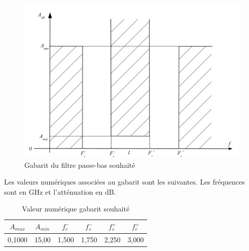 \documentclass[french]{article}
\begin{document}
\begin{figure}[H]
	\centering
	\includegraphics[width=0.5\linewidth]{ressources/gabarit_passe_bande}
	\caption{Gabarit du filtre passe-bas souhaité}
	\label{fig:gab}
\end{figure}
Les valeurs numériques associées au gabarit sont les suivantes. Les fréquences sont en GHz et l'atténuation en dB. 
	\begin{table}[H]
		\centering
\begin{tabular}{|c|c|c|c|c|c|}
		\hline
	$A_{max}$& $A_{min}$ & $f_c^-$ & $f_s^-$ & $f_s^+$ &$f_c^+$ \\ \hline
	0,1000	 & 15,00 		& 1,500	   & 1,750 & 2,250& 3,000 \\ \hline
	\end{tabular}
\caption{Valeur numérique gabarit souhaité}
	\end{table}
\end{document}
